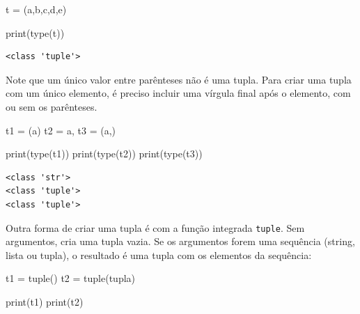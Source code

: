 \documentclass[
  brazilian,
  letterpaper,
  DIV=11,
  numbers=noendperiod]{scrreprt}
\newenvironment{Shaded}{\begin{snugshade}}{\end{snugshade}}
\newcommand{\BuiltInTok}[1]{\textcolor[rgb]{0.00,0.23,0.31}{#1}}
\newcommand{\NormalTok}[1]{\textcolor[rgb]{0.00,0.23,0.31}{#1}}
\newcommand{\OperatorTok}[1]{\textcolor[rgb]{0.37,0.37,0.37}{#1}}
\newcommand{\StringTok}[1]{\textcolor[rgb]{0.13,0.47,0.30}{#1}}
\begin{document}
\begin{Shaded}
\begin{Highlighting}[]
\NormalTok{t }\OperatorTok{=}\NormalTok{ (}\StringTok{\textquotesingle{}a\textquotesingle{}}\NormalTok{,}\StringTok{\textquotesingle{}b\textquotesingle{}}\NormalTok{,}\StringTok{\textquotesingle{}c\textquotesingle{}}\NormalTok{,}\StringTok{\textquotesingle{}d\textquotesingle{}}\NormalTok{,}\StringTok{\textquotesingle{}e\textquotesingle{}}\NormalTok{)}

\BuiltInTok{print}\NormalTok{(}\BuiltInTok{type}\NormalTok{(t))}
\end{Highlighting}
\end{Shaded}

\begin{verbatim}
<class 'tuple'>
\end{verbatim}

Note que um único valor entre parênteses não é uma tupla. Para criar uma
tupla com um único elemento, é preciso incluir uma vírgula final após o
elemento, com ou sem os parênteses.

\begin{Shaded}
\begin{Highlighting}[]
\NormalTok{t1 }\OperatorTok{=}\NormalTok{ (}\StringTok{\textquotesingle{}a\textquotesingle{}}\NormalTok{)}
\NormalTok{t2 }\OperatorTok{=} \StringTok{\textquotesingle{}a\textquotesingle{}}\NormalTok{,}
\NormalTok{t3 }\OperatorTok{=}\NormalTok{ (}\StringTok{\textquotesingle{}a\textquotesingle{}}\NormalTok{,)}

\BuiltInTok{print}\NormalTok{(}\BuiltInTok{type}\NormalTok{(t1))}
\BuiltInTok{print}\NormalTok{(}\BuiltInTok{type}\NormalTok{(t2))}
\BuiltInTok{print}\NormalTok{(}\BuiltInTok{type}\NormalTok{(t3))}
\end{Highlighting}
\end{Shaded}

\begin{verbatim}
<class 'str'>
<class 'tuple'>
<class 'tuple'>
\end{verbatim}

Outra forma de criar uma tupla é com a função integrada \texttt{tuple}.
Sem argumentos, cria uma tupla vazia. Se os argumentos forem uma
sequência (string, lista ou tupla), o resultado é uma tupla com os
elementos da sequência:

\begin{Shaded}
\begin{Highlighting}[]
\NormalTok{t1 }\OperatorTok{=} \BuiltInTok{tuple}\NormalTok{()}
\NormalTok{t2 }\OperatorTok{=} \BuiltInTok{tuple}\NormalTok{(}\StringTok{\textquotesingle{}tupla\textquotesingle{}}\NormalTok{)}

\BuiltInTok{print}\NormalTok{(t1)}
\BuiltInTok{print}\NormalTok{(t2)}
\end{Highlighting}
\end{Shaded}
\end{document}
